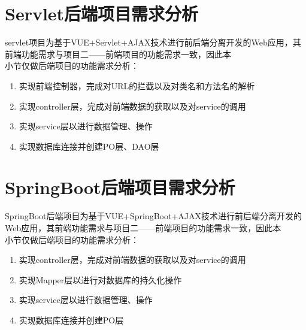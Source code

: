 \section{Servlet后端项目需求分析}
servlet项目为基于VUE+Servlet+AJAX技术进行前后端分离开发的Web应用，其前端功能需求与项目二——前端项目的功能需求一致，因此本\\
小节仅做后端项目的功能需求分析：
\begin{enumerate}
    \item 实现前端控制器，完成对URL的拦截以及对类名和方法名的解析
    \item 实现controller层，完成对前端数据的获取以及对service的调用
    \item 实现service层以进行数据管理、操作
    \item 实现数据库连接并创建PO层、DAO层
\end{enumerate}

\section{SpringBoot后端项目需求分析}
SpringBoot后端项目为基于VUE+SpringBoot+AJAX技术进行前后端分离开发的Web应用，其前端功能需求与项目二——前端项目的功能需求一致，因此本\\
小节仅做后端项目的功能需求分析：
\begin{enumerate}
    \item 实现controller层，完成对前端数据的获取以及对service的调用
    \item 实现Mapper层以进行对数据库的持久化操作
   \item 实现service层以进行数据管理、操作
    \item 实现数据库连接并创建PO层
\end{enumerate}